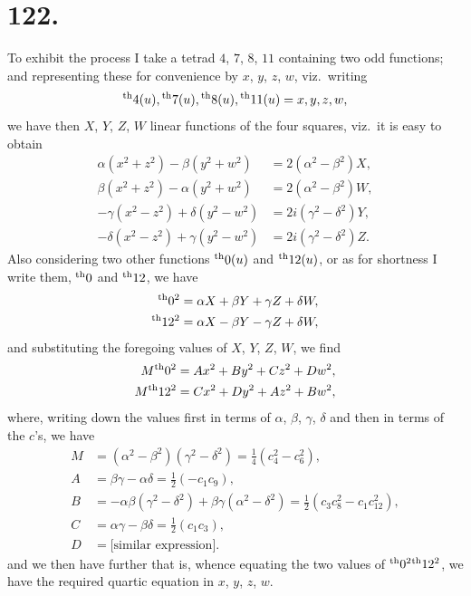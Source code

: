 \documentclass[11pt,a4paper]{book}
\providecommand{\uth}{\textsuperscript{th}}
\begin{document}
\newpage
\section*{122.}
\label{sec:122}

To exhibit the process I take a tetrad $4$, $7$, $8$, $11$ containing two odd functions; and representing these for convenience by $x$, $y$, $z$, $w$, viz.\ writing
\[
\uth{4}(u), \uth{7}(u), \uth{8}(u), \uth{11}(u) = x, y, z, w,
\]
we have then $X$, $Y$, $Z$, $W$ linear functions of the four squares, viz.\ it is easy to obtain
\begin{align*}
\alpha(x^2 + z^2) - \beta(y^2 + w^2) &= 2(\alpha^2 - \beta^2)X, \\
\beta(x^2 + z^2) - \alpha(y^2 + w^2) &= 2(\alpha^2 - \beta^2)W, \\
-\gamma(x^2 - z^2) + \delta(y^2 - w^2) &= 2i(\gamma^2 - \delta^2)Y, \\
-\delta(x^2 - z^2) + \gamma(y^2 - w^2) &= 2i(\gamma^2 - \delta^2)Z.
\end{align*}
Also considering two other functions $\uth{0}(u)$ and $\uth{12}(u)$, or as for shortness I write them, $\uth{0}$ and $\uth{12}$, we have
\begin{align*}
\uth{0}^2 &= \alpha X + \beta Y + \gamma Z + \delta W, \\
\uth{12}^2 &= \alpha X - \beta Y - \gamma Z + \delta W,
\end{align*}
and substituting the foregoing values of $X$, $Y$, $Z$, $W$, we find
\begin{align*}
M\uth{0}^2 &= Ax^2 + By^2 + Cz^2 + Dw^2, \\
M\uth{12}^2 &= Cx^2 + Dy^2 + Az^2 + Bw^2,
\end{align*}
where, writing down the values first in terms of $\alpha$, $\beta$, $\gamma$, $\delta$ and then in terms of the $c$'s, we have
\begin{align*}
M &= (\alpha^2 - \beta^2)(\gamma^2 - \delta^2) = \tfrac{1}{4}(c_4^2 - c_6^2), \\
A &= \beta\gamma - \alpha\delta = \tfrac{1}{2}(-c_1c_9), \\
B &= -\alpha\beta(\gamma^2 - \delta^2) + \beta\gamma(\alpha^2 - \delta^2) = \tfrac{1}{2}(c_3c_8^2 - c_1c_{12}^2), \\
C &= \alpha\gamma - \beta\delta = \tfrac{1}{2}(c_1c_3), \\
D &= \text{[similar expression]}.
\end{align*}
and we then have further that is, whence equating the two values of $\uth{0}^2\uth{12}^2$, we have the required quartic equation in $x$, $y$, $z$, $w$.
\end{document}

